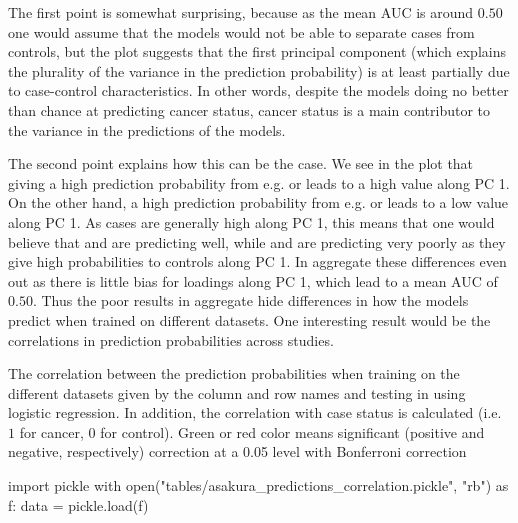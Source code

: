 {{{{{{{{{{{{{{{The first point is somewhat surprising, because as the mean AUC is around $0.50$ one would assume that the models would not be able to separate cases from controls, but the plot suggests that the first principal component (which explains the plurality of the variance in the prediction probability) is at least partially due to case-control characteristics. In other words, despite the models doing no better than chance at predicting cancer status, cancer status is a main contributor to the variance in the predictions of the models.

The second point explains how this can be the case. We see in the plot that giving a high prediction probability from e.g. \citet{Yao2019} or \citet{Reis2020} leads to a high value along PC 1. On the other hand, a high prediction probability from e.g. \citet{Leidinger2016} or \citet{Fehlmann2020} leads to a low value along PC 1. As cases are generally high along PC 1, this means that one would believe that \citet{Yao2019} and \citet{Reis2020} are predicting well, while \citet{Leidinger2016} and \citet{Fehlmann2020} are predicting very poorly as they give high probabilities to controls along PC 1. In aggregate these differences even out as there is little bias for loadings along PC 1, which lead to a mean AUC of $0.50$. Thus the poor results in aggregate hide differences in how the models predict when trained on different datasets. One interesting result would be the correlations in prediction probabilities across studies.

\begin{table}
    \caption{The correlation between the prediction probabilities when training on the different datasets given by the column and row names and testing in \citet{Asakura2020} using logistic regression. In addition, the correlation with case status is calculated (i.e. $1$ for cancer, $0$ for control). Green or red color means significant (positive and negative, respectively) correction at a 0.05 level with Bonferroni correction}
    \label{tab:asakura_predictions_correlation}
\begin{pycode}

import pickle
with open("tables/asakura_predictions_correlation.pickle", "rb") as f:
    data = pickle.load(f)


\end{pycode}
\end{table}}}}}}}}}}}}}}}}
